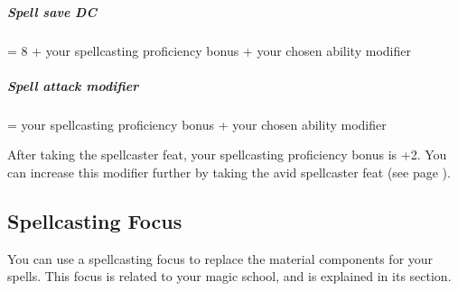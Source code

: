     \subparagraph{Spell save DC} = 8 + your spellcasting proficiency bonus + your chosen ability modifier
    \subparagraph{Spell attack modifier} = your spellcasting proficiency bonus + your chosen ability modifier

    After taking the spellcaster feat, your spellcasting proficiency bonus is +2.
    You can increase this modifier further by taking the avid spellcaster feat (see page \pageref{feat::avidspellcaster}).

\subsection*{Spellcasting Focus}
    You can use a spellcasting focus to replace the material components for your spells.
    This focus is related to your magic school, and is explained in its section.
